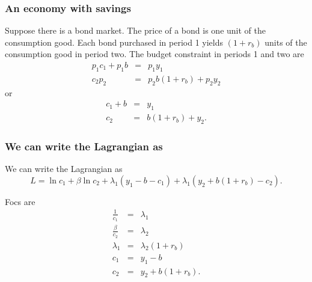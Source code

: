 \documentclass[aspectratio=169]{ltx-talk}
\begin{document}
\begin{frame}
\frametitle{An economy with savings}
Suppose there is a bond market. The price of a bond is one unit of the
consumption good. Each bond purchased in period 1 yields $\left(
1+r_{b}\right) $ units of the consumption good in period two. The budget
constraint in periods 1 and two are%
\begin{eqnarray*}
p_{1}c_{1}+p_{1}b &=&p_{1}y_{1} \\
c_{2}p_{2} &=&p_{2}b\left( 1+r_{b}\right) +p_{2}y_{2}
\end{eqnarray*}%
or%
\begin{eqnarray*}
c_{1}+b &=&y_{1} \\
c_{2} &=&b\left( 1+r_{b}\right) +y_{2}.
\end{eqnarray*}%
\end{frame}

\begin{frame}
\frametitle{We can write the Lagrangian as}
We can write the Lagrangian as 
\begin{equation*}
L=\ln c_{1}+\beta \ln c_{2}+\lambda _{1}\left( y_{1}-b-c_{1}\right) +\lambda
_{1}\left( y_{2}+b\left( 1+r_{b}\right) -c_{2}\right) .
\end{equation*}

Focs are 
\begin{eqnarray*}
\frac{1}{c_{1}} &=&\lambda _{1} \\
\frac{\beta }{c_{2}} &=&\lambda _{2} \\
\lambda _{1} &=&\lambda _{2}\left( 1+r_{b}\right) \\
c_{1} &=&y_{1}-b \\
c_{2} &=&y_{2}+b\left( 1+r_{b}\right) .
\end{eqnarray*}%
\end{frame}
\end{document}
